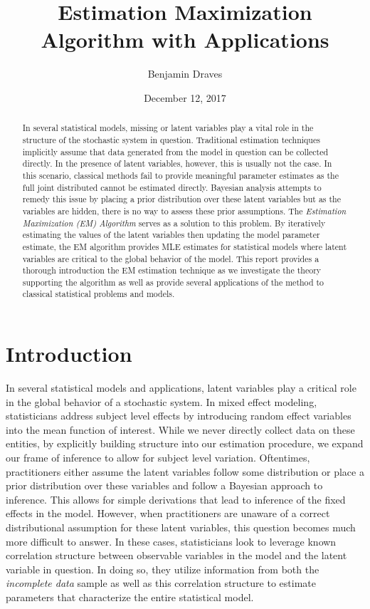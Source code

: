 \documentclass{article}
\title{Estimation Maximization Algorithm with Applications}
\author{
  Benjamin Draves
}
\date{December 12, 2017}
\begin{document}
\maketitle

\begin{abstract}
In several statistical models, missing or latent variables play a vital role in the structure of the stochastic system in question. Traditional estimation techniques implicitly assume that data generated from the model in question can be collected directly. In the presence of latent variables, however, this is usually not the case. In this scenario, classical methods fail to provide meaningful parameter estimates as the full joint distributed cannot be estimated directly. Bayesian analysis attempts to remedy this issue by placing a prior distribution over these latent variables but as the variables are hidden, there is no way to assess these prior assumptions. The \textit{Estimation Maximization (EM) Algorithm} serves as a solution to this problem. By iteratively estimating the values of the latent variables then updating the model parameter estimate, the EM algorithm provides MLE estimates for statistical models where latent variables are critical to the global behavior of the model. This report provides a thorough introduction the EM estimation technique as we investigate the theory supporting the algorithm as well as provide several applications of the method to classical statistical problems and models. 

\end{abstract}

\section{Introduction}

In several statistical models and applications, latent variables play a critical role in the global behavior of a stochastic system. In mixed effect modeling, statisticians address subject level effects by introducing random effect variables into the mean function of interest. While we never directly collect data on these entities, by explicitly building structure into our estimation procedure, we expand our frame of inference to allow for subject level variation. Oftentimes, practitioners either assume the latent variables follow some distribution or place a prior distribution over these variables and follow a Bayesian approach to inference. This allows for simple derivations that lead to inference of the fixed effects in the model. However, when practitioners are unaware of a correct distributional assumption for these latent variables, this question becomes much more difficult to answer. In these cases, statisticians look to leverage known correlation structure between observable variables in the model and the latent variable in question. In doing so, they utilize information from both the \textit{incomplete data} sample as well as this correlation structure to estimate parameters that characterize the entire statistical model. 
\end{document}
